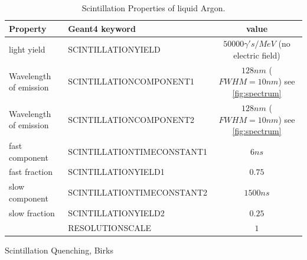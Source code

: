 \documentclass[a4paper]{jpconf}
\begin{document}
  \begin{table}[h!]
  \begin{center}
    \label{tab:table1}
    \begin{tabular}{|l|l|c|} %
      \hline
      \textbf{Property}& \textbf{Geant4 keyword} &       \textbf{value}\\
      \hline
      light yield&SCINTILLATIONYIELD & $50000 \gamma 's/MeV$ (no electric field)\\
      Wavelength of emission&SCINTILLATIONCOMPONENT1 &  $128nm$ ($FWHM=10nm$) see \ref{fig:spectrum}\\
      Wavelength of emission&SCINTILLATIONCOMPONENT2 &  $128nm$ ($FWHM=10nm$)  see \ref{fig:spectrum}\\
      fast component&SCINTILLATIONTIMECONSTANT1& $6 ns$\\  
      fast fraction&SCINTILLATIONYIELD1& $0.75$ \\
      slow component&SCINTILLATIONTIMECONSTANT2& $1500 ns$ \\
      slow fraction&SCINTILLATIONYIELD2& $0.25$\\
                   &RESOLUTIONSCALE& $1$\\
      \hline
    \end{tabular}
  \end{center}
  \caption{Scintillation Properties of liquid Argon.}
  \end{table}

  Scintillation Quenching,  Birks
  
\end{document}
